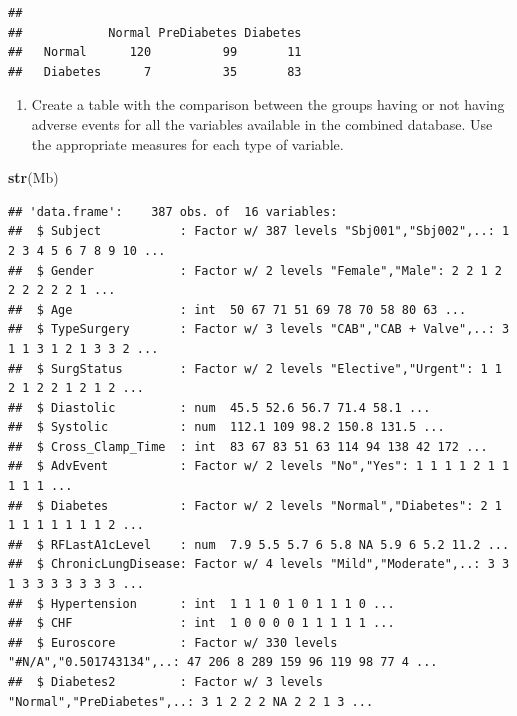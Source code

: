 \documentclass[]{book}
\newenvironment{Shaded}{\begin{snugshade}}{\end{snugshade}}
\newcommand{\KeywordTok}[1]{\textcolor[rgb]{0.13,0.29,0.53}{\textbf{#1}}}
\newcommand{\NormalTok}[1]{#1}
\providecommand{\tightlist}{%
  \setlength{\itemsep}{0pt}\setlength{\parskip}{0pt}}
\begin{document}
\begin{verbatim}
##           
##            Normal PreDiabetes Diabetes
##   Normal      120          99       11
##   Diabetes      7          35       83
\end{verbatim}

\begin{enumerate}
\def\labelenumi{\arabic{enumi}.}
\setcounter{enumi}{5}
\tightlist
\item
  Create a table with the comparison between the groups having or not having
  adverse events for all the variables available in the combined database. Use the
  appropriate measures for each type of variable.
\end{enumerate}

\begin{Shaded}
\begin{Highlighting}[]
\KeywordTok{str}\NormalTok{(Mb)}
\end{Highlighting}
\end{Shaded}

\begin{verbatim}
## 'data.frame':    387 obs. of  16 variables:
##  $ Subject           : Factor w/ 387 levels "Sbj001","Sbj002",..: 1 2 3 4 5 6 7 8 9 10 ...
##  $ Gender            : Factor w/ 2 levels "Female","Male": 2 2 1 2 2 2 2 2 2 1 ...
##  $ Age               : int  50 67 71 51 69 78 70 58 80 63 ...
##  $ TypeSurgery       : Factor w/ 3 levels "CAB","CAB + Valve",..: 3 1 1 3 1 2 1 3 3 2 ...
##  $ SurgStatus        : Factor w/ 2 levels "Elective","Urgent": 1 1 2 1 2 2 1 2 1 2 ...
##  $ Diastolic         : num  45.5 52.6 56.7 71.4 58.1 ...
##  $ Systolic          : num  112.1 109 98.2 150.8 131.5 ...
##  $ Cross_Clamp_Time  : int  83 67 83 51 63 114 94 138 42 172 ...
##  $ AdvEvent          : Factor w/ 2 levels "No","Yes": 1 1 1 1 2 1 1 1 1 1 ...
##  $ Diabetes          : Factor w/ 2 levels "Normal","Diabetes": 2 1 1 1 1 1 1 1 1 2 ...
##  $ RFLastA1cLevel    : num  7.9 5.5 5.7 6 5.8 NA 5.9 6 5.2 11.2 ...
##  $ ChronicLungDisease: Factor w/ 4 levels "Mild","Moderate",..: 3 3 1 3 3 3 3 3 3 3 ...
##  $ Hypertension      : int  1 1 1 0 1 0 1 1 1 0 ...
##  $ CHF               : int  1 0 0 0 0 1 1 1 1 1 ...
##  $ Euroscore         : Factor w/ 330 levels "#N/A","0.501743134",..: 47 206 8 289 159 96 119 98 77 4 ...
##  $ Diabetes2         : Factor w/ 3 levels "Normal","PreDiabetes",..: 3 1 2 2 2 NA 2 2 1 3 ...
\end{verbatim}
\end{document}
